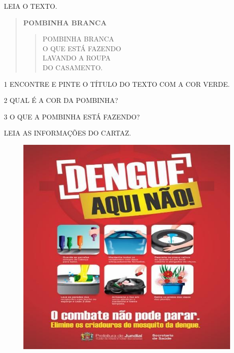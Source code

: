 LEIA O TEXTO.

\begin{quote}
\textbf{POMBINHA BRANCA}

\begin{verse}
POMBINHA BRANCA\\
O QUE ESTÁ FAZENDO\\
LAVANDO A ROUPA\\
DO CASAMENTO.
\end{verse}

\end{quote}


\num{1} ENCONTRE E PINTE O TÍTULO DO TEXTO COM A COR VERDE.

\num{2} QUAL É A COR DA POMBINHA?


\num{3} O QUE A POMBINHA ESTÁ FAZENDO?


\pagebreak
LEIA AS INFORMAÇÕES DO CARTAZ.

\begin{figure}[htpb!]
\centering
\includegraphics[width=.8\textwidth]{media/image127.jpg}
\end{figure}

